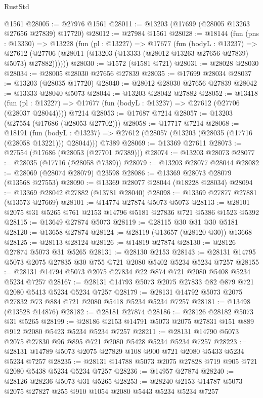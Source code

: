 \begin{lexlean}{RustStd}
\begin{coremodule}
    @1561
@28005 := @27976 @1561
@28011 := @13203 (@17699 (@28005 @13263 @27656 @27839) @17720)
@28012 := @27984 @1561
@28028 := @18144
    (fun (pns : @13330) =>
    @13228
      (fun (pl : @13227) =>
      @17677
        (fun (bodyL : @13237) =>
        @27612 (@27706 (@28011 (@13203 (@13333 (@28012 @13263 @27656 @27839) @5073) @27882))))))
@28030 := @1572 (@1581 @721)
@28031 := @28028 @28030
@28034 := @28005 @28030 @27656 @27839
@28035 := @17699 @28034
@28037 := @13203 (@28035 @17720)
@28040 := @28012 @28030 @27656 @27839
@28042 := @13333 @28040 @5073
@28044 := @13203 @28042 @27882
@28052 := @13418
    (fun (pl : @13227) => @17677 (fun (bodyL : @13237) => @27612 (@27706 (@28037 @28044))))
    @7214
@28053 := @17687 @7214
@28057 := @13203 (@27554 (@17686 (@28053 @27702)))
@28058 := @17717 @7214
@28068 := @18191
    (fun (bodyL : @13237) => @27612 (@28057 (@13203 (@28035 (@17716 (@28058 @13221))) @28044)))
    @7389
@28069 := @13369 @27611
@28073 := @27554 (@17686 (@28053 (@27701 @7389)))
@28074 := @13203 @28073
@28077 := @28035 (@17716 (@28058 @7389))
@28079 := @13203 @28077 @28044
@28082 := @28069 (@28074 @28079) @23598
@28086 := @13369 @28073 @28079 (@13568 @27553)
@28090 := @13369 @28077 @28044 (@18228 @28034)
@28094 := @13369 @28042 @27882 (@13781 @28040)
@28098 := @13369 @27877 @27881 (@13573 @27669)
@28101 := @14774 @27874 @5073 @5073
@28113 := @28101 @2075 @31 @5265 @761 @2153 @14796 @5181 @27836 @721 @5386 @1523 @5392
@28115 := @13649 @27874 @5073
@28119 := @28115 @30 @31 @30 @5181
@28120 := @13658 @27874
@28124 := @28119 (@13657 (@28120 @30)) @13668
@28125 := @28113 @28124
@28126 := @14819 @27874
@28130 := @28126 @27874 @5073 @31 @5265
@28131 := @28130 @2153
@28143 := @28131 @14795 @5073 @2075 @27835 @30 @755 @721 @2080 @5402 @5234 @5234 @7257
@28155 := @28131 @14794 @5073 @2075 @27834 @22 @874 @721 @2080 @5408 @5234 @5234 @7257
@28167 := @28131 @14793 @5073 @2075 @27833 @82 @879 @721 @2080 @5413 @5234 @5234 @7257
@28179 := @28131 @14792 @5073 @2075 @27832 @73 @884 @721 @2080 @5418 @5234 @5234 @7257
@28181 := @13498 (@13528 @14876)
@28182 := @28181 @27874
@28186 := @28126 @28182 @5073 @31 @5265
@28199 := @28186 @2153 @14791 @5073 @2075 @27831 @151 @889 @912 @2080 @5423 @5234 @5234 @7257
@28211 := @28131 @14790 @5073 @2075 @27830 @96 @895 @721 @2080 @5428 @5234 @5234 @7257
@28223 := @28131 @14789 @5073 @2075 @27829 @108 @900 @721 @2080 @5433 @5234 @5234 @7257
@28235 := @28131 @14788 @5073 @2075 @27828 @719 @905 @721 @2080 @5438 @5234 @5234 @7257
@28236 := @14957 @27874
@28240 := @28126 @28236 @5073 @31 @5265
@28253 := @28240 @2153 @14787 @5073 @2075 @27827 @255 @910 @1054 @2080 @5443 @5234 @5234 @7257

\end{coremodule}
\end{lexlean}
